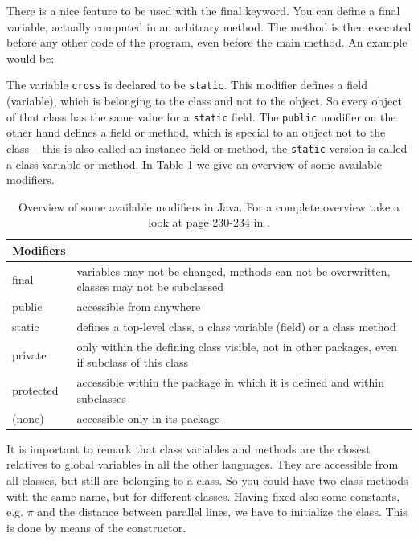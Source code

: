 There is a nice feature to be used with the final keyword. You can
define a final variable, actually computed in an arbitrary method. 
The method is then executed before any other code of the program,
even before the main method. An example would be:

 
The variable \verb|cross| is declared to be \verb|static|.  This
modifier 
defines a field (variable), which is belonging
to the class and not to the object. So every object of that class 
has the same value for a \verb|static| field. The \verb|public| modifier
on the other hand defines a field or method, which is special to 
an object not to the class -- this is also called an instance field or
method, the \verb|static| version is called a class variable or
method.
In Table \ref{tab:modifiers} we give an overview of some available modifiers.
\begin{table}[htbp]
  \begin{center}
    \leavevmode
    \begin{tabular}{l|p{8cm}}
     Modifiers &                                 \\ \hline \hline
     final & variables may not be changed, methods can not be overwritten,
             classes may not be subclassed\\\hline
     public & accessible from anywhere\\ \hline
     static & defines a top-level class, a class variable (field) or 
                 a class method\\\hline
     private & only within the defining class visible, not in other 
               packages, even if subclass of this class\\\hline
     protected & accessible within the package in which it is defined and
                 within subclasses\\\hline
     (none) & accessible only in its package\\
    \end{tabular}
    \caption{Overview of some available modifiers in Java. For a complete
      overview take a look at page 230-234 in \cite{javanutshell}.}
    \label{tab:modifiers}
  \end{center}
\end{table}
It is important to remark that
class variables and methods are the closest relatives to global 
variables in all the other languages. They are accessible from all
classes, but still are belonging to a class. So you could have two
class methods with the same name, but for different classes.
Having fixed also some constants, e.g. $\pi$ and the distance between
parallel lines, we have to initialize the class. This is done by means
of the constructor.


